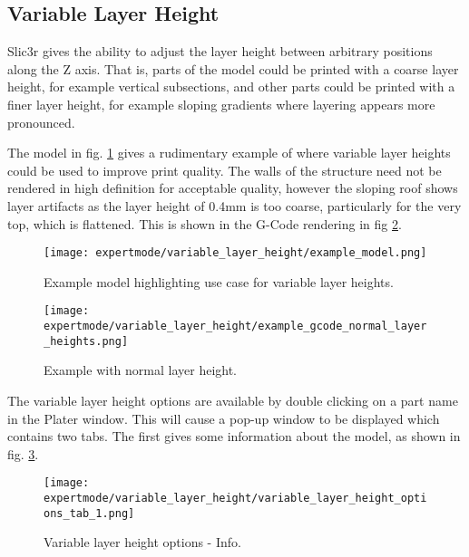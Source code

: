 
\subsection{Variable Layer Height} %
\label{sec:variable_layer_height}

Slic3r gives the ability to adjust the layer height between arbitrary positions along the Z axis.  That is, parts of the model could be printed with a coarse layer height, for example vertical subsections, and other parts could be printed with a finer layer height, for example sloping gradients where layering appears more pronounced.

The model in fig. \ref{fig:example_model} gives a rudimentary example of where variable layer heights could be used to improve print quality.  The walls of the structure need not be rendered in high definition for acceptable quality, however the sloping roof shows layer artifacts as the layer height of 0.4mm is too coarse, particularly for the very top, which is flattened.  This is shown in the G-Code rendering in fig \ref{fig:example_gcode_normal_layer_heights}.


\begin{figure}[H]
\centering
\texttt{[image: expertmode/variable\_layer\_height/example\_model.png]}
\caption{Example model highlighting use case for variable layer heights.}
\label{fig:example_model}
\end{figure}

\begin{figure}[H]
\centering
\texttt{[image: expertmode/variable\_layer\_height/example\_gcode\_normal\_layer\_heights.png]}
\caption{Example with normal layer height.}
\label{fig:example_gcode_normal_layer_heights}
\end{figure}

The variable layer height options are available by double clicking on a part name in the Plater window.  This will cause a pop-up window to be displayed which contains two tabs. The first gives some information about the model, as shown in fig. \ref{fig:variable_layer_height_options_tab_1}.

\begin{figure}[H]
\centering
\texttt{[image: expertmode/variable\_layer\_height/variable\_layer\_height\_options\_tab\_1.png]}
\caption{Variable layer height options - Info.}
\label{fig:variable_layer_height_options_tab_1}
\end{figure}


